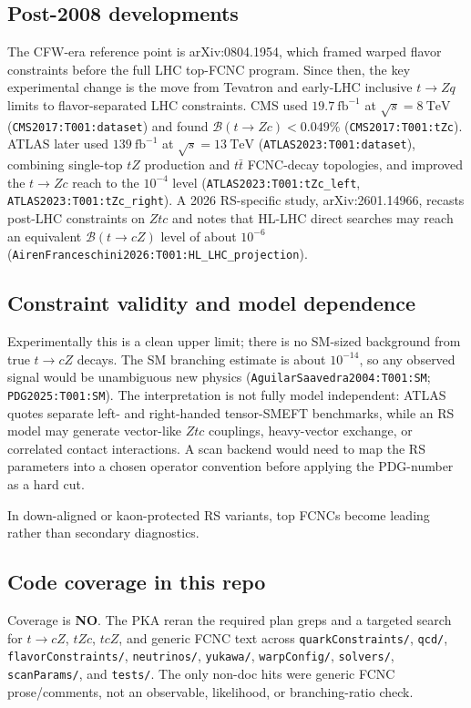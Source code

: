 \subsection*{Post-2008 developments}
The CFW-era reference point is arXiv:0804.1954, which framed warped flavor
constraints before the full LHC top-FCNC program.  Since then, the key
experimental change is the move from Tevatron and early-LHC inclusive \(t\to
Zq\) limits to flavor-separated LHC constraints.  CMS used
\(19.7~\mathrm{fb}^{-1}\) at \(\sqrt{s}=8~\mathrm{TeV}\)
(\texttt{CMS2017:T001:dataset}) and found
\(\mathcal{B}(t\to Zc)<0.049\%\) (\texttt{CMS2017:T001:tZc}).  ATLAS later used
\(139~\mathrm{fb}^{-1}\) at \(\sqrt{s}=13~\mathrm{TeV}\)
(\texttt{ATLAS2023:T001:dataset}), combining single-top \(tZ\) production and
\(t\bar t\) FCNC-decay topologies, and improved the \(t\to Zc\) reach to the
\(10^{-4}\) level (\texttt{ATLAS2023:T001:tZc\_left},
\texttt{ATLAS2023:T001:tZc\_right}).  A 2026 RS-specific study,
arXiv:2601.14966, recasts post-LHC constraints on \(Ztc\) and notes that
HL-LHC direct searches may reach an equivalent \(\mathcal{B}(t\to cZ)\) level
of about \(10^{-6}\) (\texttt{AirenFranceschini2026:T001:HL\_LHC\_projection}).

\subsection*{Constraint validity and model dependence}
Experimentally this is a clean upper limit; there is no SM-sized background
from true \(t\to cZ\) decays.  The SM branching estimate is about \(10^{-14}\),
so any observed signal would be unambiguous new physics
(\texttt{AguilarSaavedra2004:T001:SM}; \texttt{PDG2025:T001:SM}).  The
interpretation is not fully model independent: ATLAS quotes separate left- and
right-handed tensor-SMEFT benchmarks, while an RS model may generate vector-like
\(Ztc\) couplings, heavy-vector exchange, or correlated contact interactions.
A scan backend would need to map the RS parameters into a chosen operator
convention before applying the PDG-number as a hard cut.

In down-aligned or kaon-protected RS variants, top FCNCs become leading rather
than secondary diagnostics.

\subsection*{Code coverage in this repo}
Coverage is \textbf{NO}.  The PKA reran the required plan greps and a targeted
search for \(t\to cZ\), \(tZc\), \(tcZ\), and generic FCNC text across
\texttt{quarkConstraints/}, \texttt{qcd/}, \texttt{flavorConstraints/},
\texttt{neutrinos/}, \texttt{yukawa/}, \texttt{warpConfig/}, \texttt{solvers/},
\texttt{scanParams/}, and \texttt{tests/}.  The only non-doc hits were generic
FCNC prose/comments, not an observable, likelihood, or branching-ratio check.

